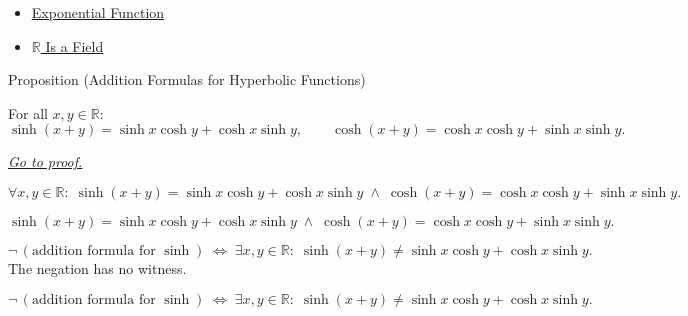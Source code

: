 \begin{dependencies}
\begin{itemize}
  \item \hyperref[def:exponential]{Exponential Function}
  \item \hyperref[thm:r-is-a-field]{$\mathbb{R}$ Is a Field}
\end{itemize}
\end{dependencies}


\begin{propositionbox}{Proposition (Addition Formulas for Hyperbolic Functions)}
\begin{proposition}
\label{prop:hyperbolic-addition}
For all $x, y \in \mathbb{R}$:
\[
  \sinh(x+y) = \sinh x \cosh y + \cosh x \sinh y,
  \qquad
  \cosh(x+y) = \cosh x \cosh y + \sinh x \sinh y.
\]

\smallskip\noindent


\hyperref[prf:hyperbolic-addition]{\textit{Go to proof.}}
\end{proposition}
\end{propositionbox}

\begin{remark*}
\[
  \forall x,y\in\mathbb{R}:\;
  \sinh(x+y) = \sinh x\cosh y + \cosh x\sinh y
  \;\wedge\;
  \cosh(x+y) = \cosh x\cosh y + \sinh x\sinh y.
\]
\end{remark*}

\begin{remark*}
\[
  \sinh(x+y) = \sinh x\cosh y + \cosh x\sinh y
  \;\wedge\;
  \cosh(x+y) = \cosh x\cosh y + \sinh x\sinh y.
\]
\end{remark*}

\begin{remark*}
\[
  \neg\,(\text{addition formula for }\sinh)
  \;\iff\;
  \exists x,y\in\mathbb{R}:\;
  \sinh(x+y) \neq \sinh x\cosh y + \cosh x\sinh y.
\]
The negation has no witness.
\end{remark*}

\begin{remark*}
\[
\neg\,(\text{addition formula for }\sinh)
  \;\iff\;
  \exists x,y\in\mathbb{R}:\;
  \sinh(x+y) \neq \sinh x\cosh y + \cosh x\sinh y.
\]
\end{remark*}

